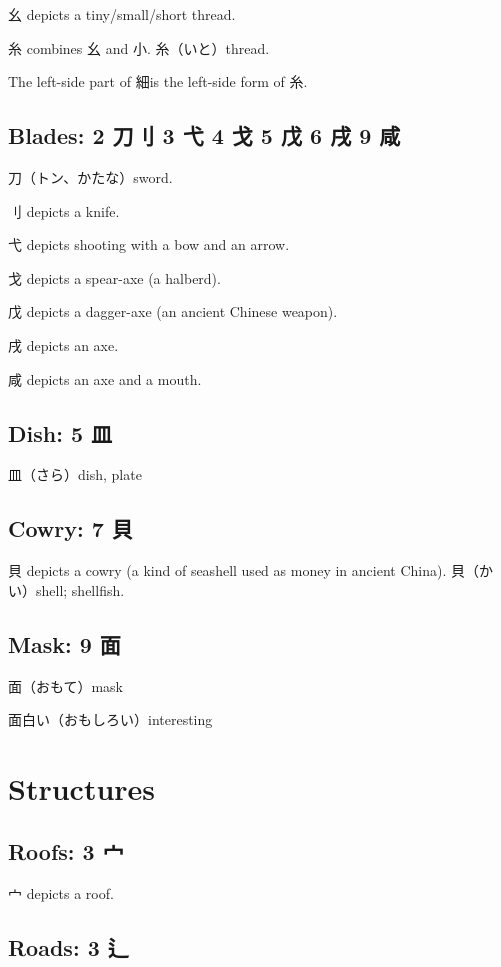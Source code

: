 幺 depicts a tiny/small/short thread.

糸 combines 幺 and 小.
糸（いと）thread.

The left-side part of 細is the left-side form of 糸.

\subsection{Blades: 2 刀刂 3 弋 4 戈 5 戊 6 戌 9 咸}

刀（トン、かたな）sword.

刂 depicts a knife.

弋 depicts shooting with a bow and an arrow.

戈 depicts a spear-axe (a halberd).

戊 depicts a dagger-axe (an ancient Chinese weapon).

戌 depicts an axe.

咸 depicts an axe and a mouth.

\subsection{Dish: 5 皿}

皿（さら）dish, plate

\subsection{Cowry: 7 貝}

貝 depicts a cowry (a kind of seashell used as money in ancient China).
貝（かい）shell; shellfish.

\subsection{Mask: 9 面}

面（おもて）mask

面白い（おもしろい）interesting

\section{Structures}

\subsection{Roofs: 3 宀}

宀 depicts a roof.

\subsection{Roads: 3 辶}

